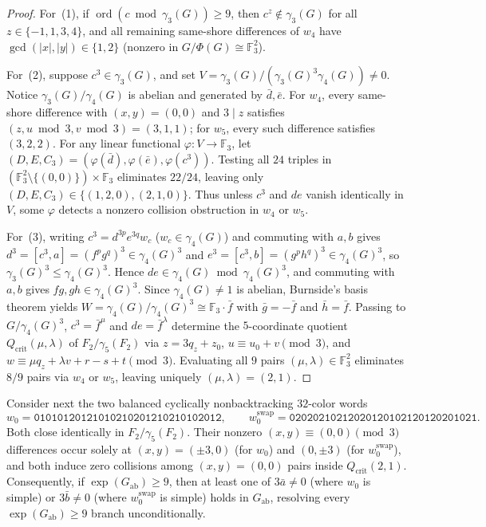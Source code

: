 \documentclass[11pt]{amsart}
\theoremstyle{definition}
\theoremstyle{remark}
\newcommand{\F}{\mathbb{F}}
\newcommand{\ord}{\operatorname{ord}}
\begin{document}
\begin{proof}
For~(1), if $\ord(c \bmod \gamma_3(G)) \ge 9$, then $c^z \notin \gamma_3(G)$ for all $z \in \{-1,1,3,4\}$, and all remaining same-shore differences of $w_4$ have $\gcd(|x|,|y|) \in \{1,2\}$ (nonzero in $G/\Phi(G) \cong \F_3^2$).

For~(2), suppose $c^3 \in \gamma_3(G)$, and set $V = \gamma_3(G)/(\gamma_3(G)^3 \gamma_4(G)) \ne 0$. Notice $\gamma_3(G)/\gamma_4(G)$ is abelian and generated by $\bar{d}, \bar{e}$. For $w_4$, every same-shore difference with $(x,y)=(0,0)$ and $3 \mid z$ satisfies $(z, u \bmod 3, v \bmod 3) = (3, 1, 1)$; for $w_5$, every such difference satisfies $(3, 2, 2)$. For any linear functional $\varphi : V \to \F_3$, let $(D, E, C_3) = (\varphi(\bar{d}), \varphi(\bar{e}), \varphi(c^3))$. Testing all $24$ triples in $(\F_3^2 \setminus \{(0,0)\}) \times \F_3$ eliminates $22/24$, leaving only $(D, E, C_3) \in \{(1,2,0), (2,1,0)\}$. Thus unless $c^3$ and $de$ vanish identically in $V$, some $\varphi$ detects a nonzero collision obstruction in $w_4$ or $w_5$.

For~(3), writing $c^3 = d^{3p} e^{3q} w_c$ ($w_c \in \gamma_4(G)$) and commuting with $a, b$ gives $d^3 = [c^3, a] = (f^p g^q)^3 \in \gamma_4(G)^3$ and $e^3 = [c^3, b] = (g^p h^q)^3 \in \gamma_4(G)^3$, so $\gamma_3(G)^3 \le \gamma_4(G)^3$. Hence $de \in \gamma_4(G) \bmod \gamma_4(G)^3$, and commuting with $a, b$ gives $fg, gh \in \gamma_4(G)^3$. Since $\gamma_4(G) \ne 1$ is abelian, Burnside's basis theorem yields $W = \gamma_4(G)/\gamma_4(G)^3 \cong \F_3 \cdot \bar{f}$ with $\bar{g} = -\bar{f}$ and $\bar{h} = \bar{f}$. Passing to $G/\gamma_4(G)^3$, $c^3 = \bar{f}^\mu$ and $de = \bar{f}^\lambda$ determine the $5$-coordinate quotient $Q_{\mathrm{crit}}(\mu,\lambda)$ of $F_2/\gamma_5(F_2)$ via $z = 3q_z + z_0$, $u \equiv u_0 + v \pmod 3$, and $w \equiv \mu q_z + \lambda v + r - s + t \pmod 3$. Evaluating all $9$ pairs $(\mu, \lambda) \in \F_3^2$ eliminates $8/9$ pairs via $w_4$ or $w_5$, leaving uniquely $(\mu, \lambda) = (2, 1)$.
\end{proof}

Consider next the two balanced cyclically nonbacktracking $32$-color words
\[
w_0 = \mathtt{01010120121010210201210210102012},\qquad
w_0^{\mathrm{swap}} = \mathtt{02020210212020120102120120201021}.
\]
Both close identically in $F_2/\gamma_5(F_2)$. Their nonzero $(x,y) \equiv (0,0) \pmod 3$ differences occur solely at $(x,y) = (\pm 3, 0)$ (for $w_0$) and $(0, \pm 3)$ (for $w_0^{\mathrm{swap}}$), and both induce zero collisions among $(x,y)=(0,0)$ pairs inside $Q_{\mathrm{crit}}(2, 1)$. Consequently, if $\exp(G_{\mathrm{ab}}) \ge 9$, then at least one of $3\bar{a} \ne 0$ (where $w_0$ is simple) or $3\bar{b} \ne 0$ (where $w_0^{\mathrm{swap}}$ is simple) holds in $G_{\mathrm{ab}}$, resolving every $\exp(G_{\mathrm{ab}}) \ge 9$ branch unconditionally.
\end{document}
